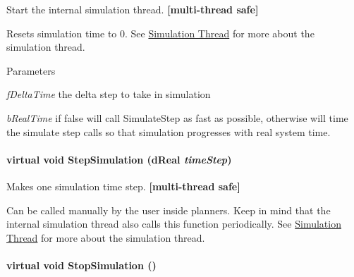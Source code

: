 Start the internal simulation thread. {\bfseries \mbox{[}multi-\/thread safe\mbox{]}} 

Resets simulation time to 0. See \hyperlink{architecture__concepts_arch_simulation}{Simulation Thread} for more about the simulation thread.


\begin{DoxyParams}{Parameters}
\item[{\em fDeltaTime}]the delta step to take in simulation \item[{\em bRealTime}]if false will call SimulateStep as fast as possible, otherwise will time the simulate step calls so that simulation progresses with real system time. \end{DoxyParams}
\hypertarget{classOpenRAVE_1_1EnvironmentBase_aebf2566ccd76644b0040f01e70d2c189}{
\paragraph[{StepSimulation}]{\setlength{\rightskip}{0pt plus 5cm}virtual void StepSimulation (dReal {\em timeStep})}\hfill}
\label{classOpenRAVE_1_1EnvironmentBase_aebf2566ccd76644b0040f01e70d2c189}


Makes one simulation time step. {\bfseries \mbox{[}multi-\/thread safe\mbox{]}} 

Can be called manually by the user inside planners. Keep in mind that the internal simulation thread also calls this function periodically. See \hyperlink{architecture__concepts_arch_simulation}{Simulation Thread} for more about the simulation thread. \hypertarget{classOpenRAVE_1_1EnvironmentBase_a2fcaf7d48ec497898ad0ef0c5a3eb89b}{
\paragraph[{StopSimulation}]{\setlength{\rightskip}{0pt plus 5cm}virtual void StopSimulation ()}\hfill}
\label{classOpenRAVE_1_1EnvironmentBase_a2fcaf7d48ec497898ad0ef0c5a3eb89b}


